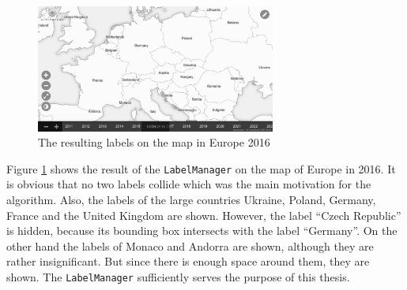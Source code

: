 \begin{figure}[ht]
  \centering
  \includegraphics[width=0.7\textwidth]{graphics/development/application/label_manager.png}
  \caption{The resulting labels on the map in Europe 2016}
  \label{fig:label_manager}
\end{figure}

Figure \ref{fig:label_manager} shows the result of the \texttt{LabelManager} on the map of Europe in 2016. It is obvious that no two labels collide which was the main motivation for the algorithm. Also, the labels of the large countries Ukraine, Poland, Germany, France and the United Kingdom are shown. However, the label ``Czech Republic'' is hidden, because its bounding box intersects with the label ``Germany''. On the other hand the labels of Monaco and Andorra are shown, although they are rather insignificant. But since there is enough space around them, they are shown. The \texttt{LabelManager} sufficiently serves the purpose of this thesis.



